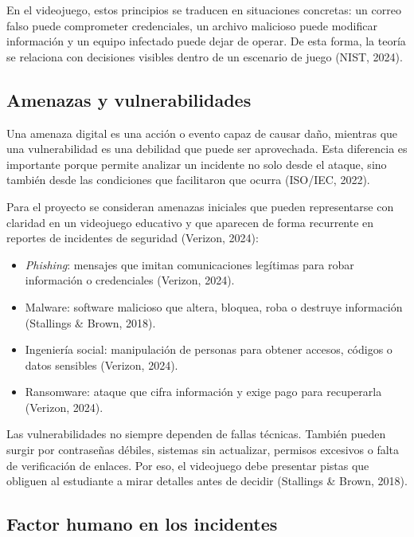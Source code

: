 En el videojuego, estos principios se traducen en situaciones concretas: un correo falso puede comprometer credenciales, un archivo malicioso puede modificar informaci\'{o}n y un equipo infectado puede dejar de operar. De esta forma, la teor\'{i}a se relaciona con decisiones visibles dentro de un escenario de juego (NIST, 2024).

\subsection{Amenazas y vulnerabilidades}

Una amenaza digital es una acci\'{o}n o evento capaz de causar da\~{n}o, mientras que una vulnerabilidad es una debilidad que puede ser aprovechada. Esta diferencia es importante porque permite analizar un incidente no solo desde el ataque, sino tambi\'{e}n desde las condiciones que facilitaron que ocurra (ISO/IEC, 2022).

Para el proyecto se consideran amenazas iniciales que pueden representarse con claridad en un videojuego educativo y que aparecen de forma recurrente en reportes de incidentes de seguridad (Verizon, 2024):

\begin{itemize}
    \item \textit{Phishing}: mensajes que imitan comunicaciones leg\'{i}timas para robar informaci\'{o}n o credenciales (Verizon, 2024).
    \item Malware: software malicioso que altera, bloquea, roba o destruye informaci\'{o}n (Stallings \& Brown, 2018).
    \item Ingenier\'{i}a social: manipulaci\'{o}n de personas para obtener accesos, c\'{o}digos o datos sensibles (Verizon, 2024).
    \item Ransomware: ataque que cifra informaci\'{o}n y exige pago para recuperarla (Verizon, 2024).
\end{itemize}

Las vulnerabilidades no siempre dependen de fallas t\'{e}cnicas. Tambi\'{e}n pueden surgir por contrase\~{n}as d\'{e}biles, sistemas sin actualizar, permisos excesivos o falta de verificaci\'{o}n de enlaces. Por eso, el videojuego debe presentar pistas que obliguen al estudiante a mirar detalles antes de decidir (Stallings \& Brown, 2018).

\subsection{Factor humano en los incidentes}

